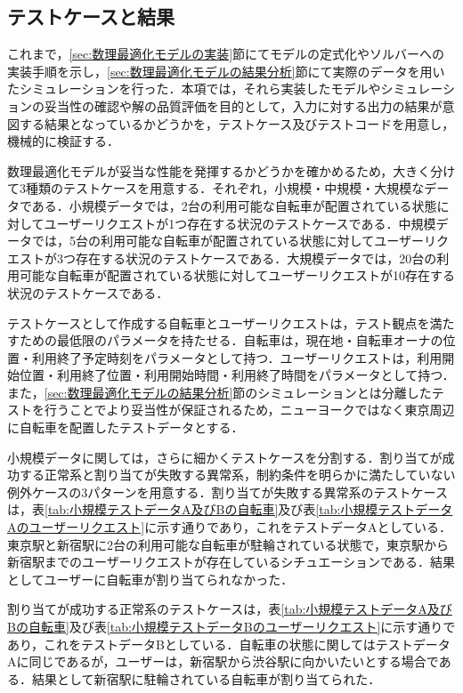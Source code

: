       \subsection{テストケースと結果}
        \label{sec:テストケースと結果}
          \par これまで，\ref{sec:数理最適化モデルの実装}節にてモデルの定式化やソルバーへの実装手順を示し，\ref{sec:数理最適化モデルの結果分析}節にて実際のデータを用いたシミュレーションを行った．本項では，それら実装したモデルやシミュレーションの妥当性の確認や解の品質評価を目的として，入力に対する出力の結果が意図する結果となっているかどうかを，テストケース及びテストコードを用意し，機械的に検証する．
          \par 数理最適化モデルが妥当な性能を発揮するかどうかを確かめるため，大きく分けて3種類のテストケースを用意する．それぞれ，小規模・中規模・大規模なデータである．小規模データでは，2台の利用可能な自転車が配置されている状態に対してユーザーリクエストが1つ存在する状況のテストケースである．中規模データでは，5台の利用可能な自転車が配置されている状態に対してユーザーリクエストが3つ存在する状況のテストケースである．大規模データでは，20台の利用可能な自転車が配置されている状態に対してユーザーリクエストが10存在する状況のテストケースである．
          \par テストケースとして作成する自転車とユーザーリクエストは，テスト観点を満たすための最低限のパラメータを持たせる．自転車は，現在地・自転車オーナの位置・利用終了予定時刻をパラメータとして持つ．ユーザーリクエストは，利用開始位置・利用終了位置・利用開始時間・利用終了時間をパラメータとして持つ．また，\ref{sec:数理最適化モデルの結果分析}節のシミュレーションとは分離したテストを行うことでより妥当性が保証されるため，ニューヨークではなく東京周辺に自転車を配置したテストデータとする．
          \par 小規模データに関しては，さらに細かくテストケースを分割する．割り当てが成功する正常系と割り当てが失敗する異常系，制約条件を明らかに満たしていない例外ケースの3パターンを用意する．割り当てが失敗する異常系のテストケースは，表\ref{tab:小規模テストデータA及びBの自転車}及び表\ref{tab:小規模テストデータAのユーザーリクエスト}に示す通りであり，これをテストデータAとしている．東京駅と新宿駅に2台の利用可能な自転車が駐輪されている状態で，東京駅から新宿駅までのユーザーリクエストが存在しているシチュエーションである．結果としてユーザーに自転車が割り当てられなかった．
          \par 割り当てが成功する正常系のテストケースは，表\ref{tab:小規模テストデータA及びBの自転車}及び表\ref{tab:小規模テストデータBのユーザーリクエスト}に示す通りであり，これをテストデータBとしている．自転車の状態に関してはテストデータAに同じであるが，ユーザーは，新宿駅から渋谷駅に向かいたいとする場合である．結果として新宿駅に駐輪されている自転車が割り当てられた．

